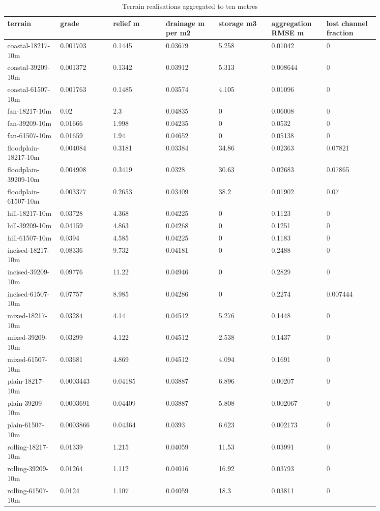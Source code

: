 \begingroup
\small
\setlength{\tabcolsep}{2pt}
\begin{longtable}{p{0.1257\linewidth}p{0.1257\linewidth}p{0.1257\linewidth}p{0.1257\linewidth}p{0.1257\linewidth}p{0.1257\linewidth}p{0.1257\linewidth}}
\caption{Terrain realisations aggregated to ten metres}\\
\hline
terrain & grade & relief m & drainage m per m2 & storage m3 & aggregation RMSE m & lost channel fraction \\
\hline\endhead
coastal-18217-10m & 0.001703 & 0.1445 & 0.03679 & 5.258 & 0.01042 & 0 \\
coastal-39209-10m & 0.001372 & 0.1342 & 0.03912 & 5.313 & 0.008644 & 0 \\
coastal-61507-10m & 0.001763 & 0.1485 & 0.03574 & 4.105 & 0.01096 & 0 \\
fan-18217-10m & 0.02 & 2.3 & 0.04835 & 0 & 0.06008 & 0 \\
fan-39209-10m & 0.01666 & 1.998 & 0.04235 & 0 & 0.0532 & 0 \\
fan-61507-10m & 0.01659 & 1.94 & 0.04652 & 0 & 0.05138 & 0 \\
floodplain-18217-10m & 0.004084 & 0.3181 & 0.03384 & 34.86 & 0.02363 & 0.07821 \\
floodplain-39209-10m & 0.004908 & 0.3419 & 0.0328 & 30.63 & 0.02683 & 0.07865 \\
floodplain-61507-10m & 0.003377 & 0.2653 & 0.03409 & 38.2 & 0.01902 & 0.07 \\
hill-18217-10m & 0.03728 & 4.368 & 0.04225 & 0 & 0.1123 & 0 \\
hill-39209-10m & 0.04159 & 4.863 & 0.04268 & 0 & 0.1251 & 0 \\
hill-61507-10m & 0.0394 & 4.585 & 0.04225 & 0 & 0.1183 & 0 \\
incised-18217-10m & 0.08336 & 9.732 & 0.04181 & 0 & 0.2488 & 0 \\
incised-39209-10m & 0.09776 & 11.22 & 0.04946 & 0 & 0.2829 & 0 \\
incised-61507-10m & 0.07757 & 8.985 & 0.04286 & 0 & 0.2274 & 0.007444 \\
mixed-18217-10m & 0.03284 & 4.14 & 0.04512 & 5.276 & 0.1448 & 0 \\
mixed-39209-10m & 0.03299 & 4.122 & 0.04512 & 2.538 & 0.1437 & 0 \\
mixed-61507-10m & 0.03681 & 4.869 & 0.04512 & 4.094 & 0.1691 & 0 \\
plain-18217-10m & 0.0003443 & 0.04185 & 0.03887 & 6.896 & 0.00207 & 0 \\
plain-39209-10m & 0.0003691 & 0.04409 & 0.03887 & 5.808 & 0.002067 & 0 \\
plain-61507-10m & 0.0003866 & 0.04364 & 0.0393 & 6.623 & 0.002173 & 0 \\
rolling-18217-10m & 0.01339 & 1.215 & 0.04059 & 11.53 & 0.03991 & 0 \\
rolling-39209-10m & 0.01264 & 1.112 & 0.04016 & 16.92 & 0.03793 & 0 \\
rolling-61507-10m & 0.0124 & 1.107 & 0.04059 & 18.3 & 0.03811 & 0 \\
\end{longtable}
\endgroup
